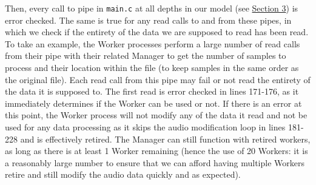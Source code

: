 \documentclass[11pt]{extarticle}
\begin{document}


Then, every call to pipe in \texttt{main.c} at all depths in our model (see \hyperref[arch]{Section 3}) is error checked. The same is true for any read calls to and from these pipes, in which we check if the entirety of the data we are supposed to read has been read. To take an example, the Worker processes perform a large number of read calls from their pipe with their related Manager to get the number of samples to process and their location within the file (to keep samples in the same order as the original file). Each read call from this pipe may fail or not read the entirety of the data it is supposed to. The first read is error checked in lines 171-176, as it immediately determines if the Worker can be used or not. If there is an error at this point, the Worker process will not modify any of the data it read and not be used for any data processing as it skips the audio modification loop in lines 181-228 and is effectively retired. The Manager can still function with retired workers, as long as there is at least 1 Worker remaining (hence the use of 20 Workers: it is a reasonably large number to ensure that we can afford having multiple Workers retire and still modify the audio data quickly and as expected).
\end{document}
